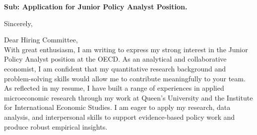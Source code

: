 \documentclass[11pt,a4paper,roman]{moderncv}
\begin{document}
\date{\today}
\opening{\textbf{Sub: Application for Junior Policy Analyst Position.}}
\closing{Sincerely, \vspace{-1em}}


\makelettertitle



Dear Hiring Committee,
\\
\vspace{1em}
With great enthusiasm, I am writing to express my strong interest in the Junior Policy Analyst position at the OECD. As an analytical and collaborative economist, I am confident that my quantitative research background and problem-solving skills would allow me to contribute meaningfully to your team.\\

\vspace{1em}
As reflected in my resume, I have built a range of experiences in applied microeconomic research through my work at Queen's University and the Institute for International Economic Studies. I am eager to apply my research, data analysis, and interpersonal skills to support evidence-based policy work and produce robust empirical insights.\\
\vspace{1em}
\end{document}
